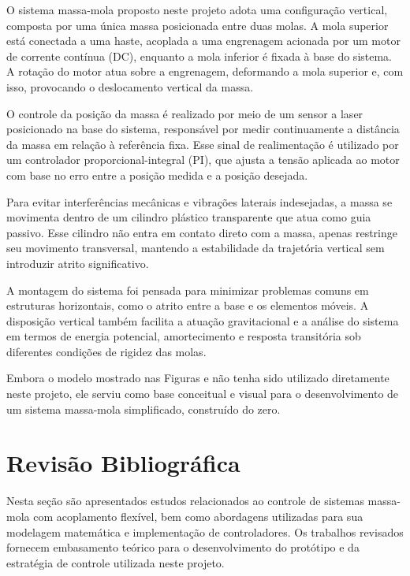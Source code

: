\documentclass[9pt,a4paper,twocolumn,twoside]{tau-class/tau}
\begin{document}
O sistema massa-mola proposto neste projeto adota uma configuração vertical, composta por uma única massa posicionada entre duas molas. A mola superior está conectada a uma haste, acoplada a uma engrenagem acionada por um motor de corrente contínua (DC), enquanto a mola inferior é fixada à base do sistema. A rotação do motor atua sobre a engrenagem, deformando a mola superior e, com isso, provocando o deslocamento vertical da massa.

O controle da posição da massa é realizado por meio de um sensor a laser posicionado na base do sistema, responsável por medir continuamente a distância da massa em relação à referência fixa. Esse sinal de realimentação é utilizado por um controlador proporcional-integral (PI), que ajusta a tensão aplicada ao motor com base no erro entre a posição medida e a posição desejada.

Para evitar interferências mecânicas e vibrações laterais indesejadas, a massa se movimenta dentro de um cilindro plástico transparente que atua como guia passivo. Esse cilindro não entra em contato direto com a massa, apenas restringe seu movimento transversal, mantendo a estabilidade da trajetória vertical sem introduzir atrito significativo.

A montagem do sistema foi pensada para minimizar problemas comuns em estruturas horizontais, como o atrito entre a base e os elementos móveis. A disposição vertical também facilita a atuação gravitacional e a análise do sistema em termos de energia potencial, amortecimento e resposta transitória sob diferentes condições de rigidez das molas.

Embora o modelo mostrado nas Figuras e não tenha sido utilizado diretamente neste projeto, ele serviu como base conceitual e visual para o desenvolvimento de um sistema massa-mola simplificado, construído do zero.

\section{Revisão Bibliográfica}

    Nesta seção são apresentados estudos relacionados ao controle de sistemas massa-mola com acoplamento flexível, bem como abordagens utilizadas para sua modelagem matemática e implementação de controladores. Os trabalhos revisados fornecem embasamento teórico para o desenvolvimento do protótipo e da estratégia de controle utilizada neste projeto.
\end{document}
